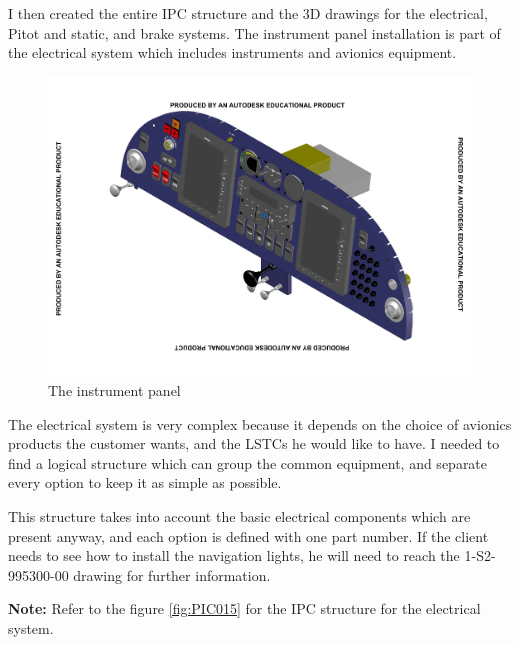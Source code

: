 \documentclass[11pt,a4paper]{article}
\begin{document}
\newpage

I then created the entire IPC structure and the 3D drawings for the electrical, Pitot and static, and brake systems. The instrument panel installation is part of the electrical system which includes instruments and avionics equipment.

\begin{figure}[ht!]
	\begin{center}
		\includegraphics[width=15cm,trim = 2cm 2.2cm 2cm 2.2cm, clip]{pics/PIC016.pdf}
		\caption{The instrument panel}
		\label{fig:PIC016}
	\end{center}
\end{figure}

The electrical system is very complex because it depends on the choice of avionics products the customer wants, and the LSTCs he would like to have. I needed to find a logical structure which can group the common equipment, and separate every option to keep it as simple as possible.

\bigskip

This structure takes into account the basic electrical components which are present anyway, and each option is defined with one part number. If the client needs to see how to install the navigation lights, he will need to reach the 1-S2-995300-00 drawing for further information.

\bigskip

\textbf{Note:} Refer to the figure \ref{fig:PIC015} for the IPC structure for the electrical system.
\end{document}

